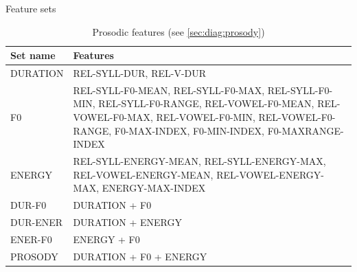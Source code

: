 		\begin{table}
			\centering
			\caption{Feature sets }
			
			\begin{subtable}[h]{\textwidth}
				\centering
				\caption{Prosodic features (see \cref{sec:diag:prosody})}
				\begin{tabularx}{.65\textwidth}{lX}
				\toprule
				Set name & Features \\
				\midrule
				DURATION & 	REL-SYLL-DUR, REL-V-DUR \\
				\addlinespace
				F0 &	REL-SYLL-F0-MEAN,\newline
						REL-SYLL-F0-MAX, \newline
						REL-SYLL-F0-MIN, \newline
						REL-SYLL-F0-RANGE, \newline
						REL-VOWEL-F0-MEAN, \newline
						REL-VOWEL-F0-MAX, \newline
						REL-VOWEL-F0-MIN, \newline
						REL-VOWEL-F0-RANGE, \newline
						F0-MAX-INDEX, \newline
						F0-MIN-INDEX, \newline
						F0-MAXRANGE-INDEX \\
				\addlinespace
				ENERGY &	REL-SYLL-ENERGY-MEAN, \newline
								REL-SYLL-ENERGY-MAX, \newline
								REL-VOWEL-ENERGY-MEAN, \newline
								REL-VOWEL-ENERGY-MAX, \newline
								ENERGY-MAX-INDEX \\
				\addlinespace
				DUR-F0 & DURATION + F0 \\
				DUR-ENER & DURATION + ENERGY \\
				ENER-F0 & ENERGY + F0 \\
				PROSODY & DURATION + F0 + ENERGY \\
				\bottomrule
				\end{tabularx}
			\end{subtable}
			
			\vspace{1.5em}			
			

\end{table}
